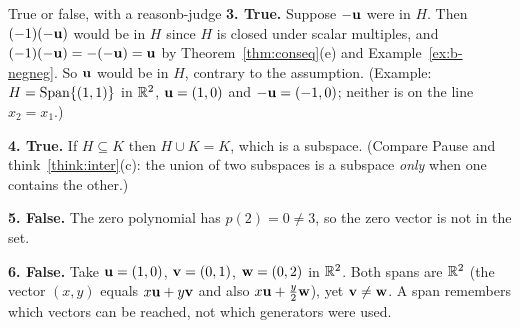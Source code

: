 \documentclass[11pt]{article}
\begin{document}
\begin{exmp}{True or false, with a reason}{b-judge}
\textbf{3. True.} Suppose $-\mathbf{u}$ were in $H$. Then $(-1)(-\mathbf{u})$ would be in $H$ since $H$ is closed under scalar multiples, and $(-1)(-\mathbf{u})=-(-\mathbf{u})=\mathbf{u}$ by Theorem~\ref{thm:conseq}(e) and Example~\ref{ex:b-negneg}. So $\mathbf{u}$ would be in $H$, contrary to the assumption. (Example: $H=\operatorname{Span}\{(1,1)\}$ in $\mathbb{R}^2$, $\mathbf{u}=(1,0)$ and $-\mathbf{u}=(-1,0)$; neither is on the line $x_2=x_1$.)

\textbf{4. True.} If $H\subseteq K$ then $H\cup K=K$, which is a subspace. (Compare Pause and think~\ref{think:inter}(c): the union of two subspaces is a subspace \emph{only} when one contains the other.)

\textbf{5. False.} The zero polynomial has $p(2)=0\neq3$, so the zero vector is not in the set.

\textbf{6. False.} Take $\mathbf{u}=(1,0)$, $\mathbf{v}=(0,1)$, $\mathbf{w}=(0,2)$ in $\mathbb{R}^2$. Both spans are $\mathbb{R}^2$ (the vector $(x,y)$ equals $x\mathbf{u}+y\mathbf{v}$ and also $x\mathbf{u}+\tfrac y2\mathbf{w}$), yet $\mathbf{v}\neq\mathbf{w}$. A span remembers which vectors can be reached, not which generators were used.
\end{exmp}
\end{document}
